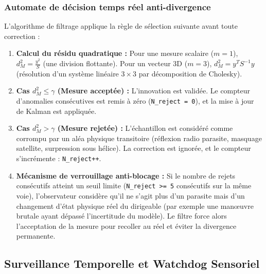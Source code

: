 \documentclass[../Implementation.tex]{subfiles}
\begin{document}
\subsubsection{Automate de décision temps réel anti-divergence}
L'algorithme de filtrage applique la règle de sélection suivante avant toute correction :
\begin{enumerate}
    \item \textbf{Calcul du résidu quadratique :} Pour une mesure scalaire ($m=1$), $d_M^2 = \frac{y^2}{S}$ (une division flottante). Pour un vecteur 3D ($m=3$), $d_M^2 = y^T S^{-1} y$ (résolution d'un système linéaire $3 \times 3$ par décomposition de Cholesky).
    \item \textbf{Cas $d_M^2 \le \gamma$ (Mesure acceptée) :} L'innovation est validée. Le compteur d'anomalies consécutives est remis à zéro (\lstinline|N_reject = 0|), et la mise à jour de Kalman est appliquée.
    \item \textbf{Cas $d_M^2 > \gamma$ (Mesure rejetée) :} L'échantillon est considéré comme corrompu par un aléa physique transitoire (réflexion radio parasite, masquage satellite, surpression sous hélice). La correction est ignorée, et le compteur s'incrémente : \lstinline|N_reject++|.
    \item \textbf{Mécanisme de verrouillage anti-blocage :} Si le nombre de rejets consécutifs atteint un seuil limite (\lstinline|N_reject >= 5| consécutifs sur la même voie), l'observateur considère qu'il ne s'agit plus d'un parasite mais d'un changement d'état physique réel du dirigeable (par exemple une manœuvre brutale ayant dépassé l'incertitude du modèle). Le filtre force alors l'acceptation de la mesure pour recoller au réel et éviter la divergence permanente.
\end{enumerate}

\subsection{Surveillance Temporelle et Watchdog Sensoriel}
\end{document}
